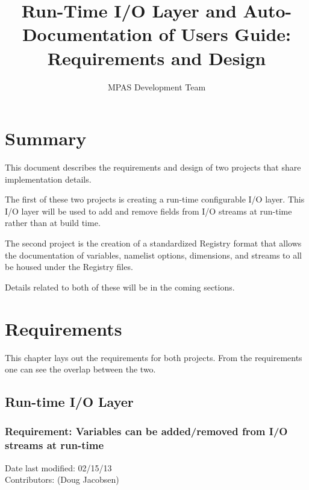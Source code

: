 \documentclass[11pt]{report}
\begin{document}
\title{Run-Time I/O Layer and Auto-Documentation of Users Guide: \\
Requirements and Design}
\author{MPAS Development Team}

\maketitle
\tableofcontents


\chapter{Summary}

This document describes the requirements and design of two projects that share
implementation details.

The first of these two projects is creating a run-time configurable I/O layer.
This I/O layer will be used to add and remove fields from I/O streams at
run-time rather than at build time. 

The second project is the creation of a standardized Registry format that
allows the documentation of variables, namelist options, dimensions, and
streams to all be housed under the Registry files.

Details related to both of these will be in the coming sections.



\chapter{Requirements}

This chapter lays out the requirements for both projects. From the requirements one can see the overlap between the two.

\section{Run-time I/O Layer}
\subsection{Requirement: Variables can be added/removed from I/O streams at run-time}
Date last modified: 02/15/13 \\
Contributors: (Doug Jacobsen) \\
\end{document}
